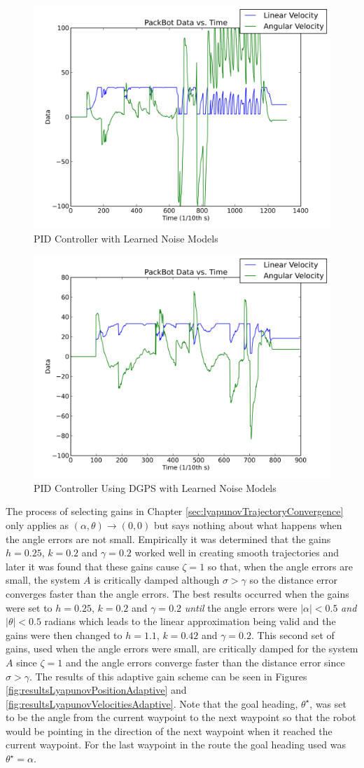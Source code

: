 \begin{figure}[ht!]
	\centering
	\includegraphics[width=.5\textwidth]{images/pbtx/20101203_1751_pbtxPidNewQR}
	\caption{PID Controller with Learned Noise Models}
	\label{fig:resultsLyapunov5}
\end{figure}

\begin{figure}[ht!]
	\centering
	\includegraphics[width=.5\textwidth]{images/pbtx/20101203_1803_pbtxPidUsingDgpsNewQR}
	\caption{PID Controller Using DGPS with Learned Noise Models}
	\label{fig:resultsLyapunov6}
\end{figure}

The process of selecting gains in Chapter \ref{sec:lyapunovTrajectoryConvergence} only applies as $(\alpha, \theta)\to(0,0)$ but says nothing about what happens when the angle errors are not small. Empirically it was determined that the gains $h=0.25$, $k=0.2$ and $\gamma=0.2$ worked well in creating smooth trajectories and later it was found that these gains cause $\zeta=1$ so that, when the angle errors are small, the system $A$ is critically damped although $\sigma>\gamma$ so the distance error converges faster than the angle errors. The best results occurred when the gains were set to $h=0.25$, $k=0.2$ and $\gamma=0.2$ \textit{until} the angle errors were $|\alpha|<0.5$ \textit{and} $|\theta|<0.5$ radians which leads to the linear approximation being valid and the gains were then changed to $h=1.1$, $k=0.42$ and $\gamma=0.2$. This second set of gains, used when the angle errors were small, are critically damped for the system $A$ since $\zeta=1$ and the angle errors converge faster than the distance error since $\sigma>\gamma$. The results of this adaptive gain scheme can be seen in Figures \ref{fig:resultsLyapunovPositionAdaptive} and \ref{fig:resultsLyapunovVelocitiesAdaptive}. Note that the goal heading, $\theta^\star$, was set to be the angle from the current waypoint to the next waypoint so that the robot would be pointing in the direction of the next waypoint when it reached the current waypoint. For the last waypoint in the route the goal heading used was $\theta^\star=\alpha$.

